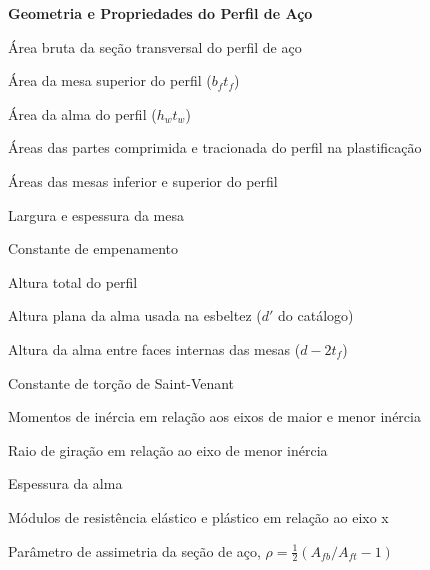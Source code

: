 \begin{simbolos}

  \item[] \textbf{Geometria e Propriedades do Perfil de Aço}
  \item[$A_a$] Área bruta da seção transversal do perfil de aço
  \item[$A_{af}$] Área da mesa superior do perfil ($b_f t_f$)
  \item[$A_{aw}$] Área da alma do perfil ($h_w t_w$)
  \item[$A_c, A_t$] Áreas das partes comprimida e tracionada do perfil na plastificação
  \item[$A_{fb}, A_{ft}$] Áreas das mesas inferior e superior do perfil
  \item[$b_f, t_f$] Largura e espessura da mesa
  \item[$C_w$] Constante de empenamento
  \item[$d$] Altura total do perfil
  \item[$h$] Altura plana da alma usada na esbeltez ($d'$ do catálogo)
  \item[$h_w$] Altura da alma entre faces internas das mesas ($d - 2t_f$)
  \item[$I_t$ ($J$)] Constante de torção de Saint-Venant
  \item[$I_x, I_y$] Momentos de inércia em relação aos eixos de maior e menor inércia
  \item[$r_y$] Raio de giração em relação ao eixo de menor inércia
  \item[$t_w$] Espessura da alma
  \item[$W_x, Z_x$] Módulos de resistência elástico e plástico em relação ao eixo x
  \item[$\rho$] Parâmetro de assimetria da seção de aço, $\rho = \frac{1}{2}(A_{fb}/A_{ft} - 1)$


\end{simbolos}

